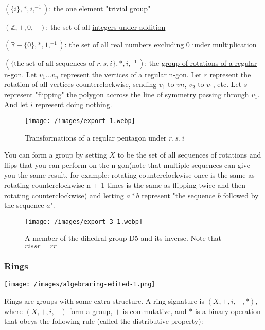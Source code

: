 \documentclass{article}
\begin{document}
\begin{itemize}
\item{$ (\{i\}, \ast, i, ^{-1})$: the one element "trivial group"}
\item{$ (\mathbb{Z}, +, 0, -)$: the set of all \href{https://en.wikipedia.org/wiki/Integer}{integers under addition}
\item{$ (\mathbb{R} - \{0\}, \ast, 1, ^{-1})$: the set of all real numbers excluding 0 under multiplication}
\item{$ (\{\text{the set of all sequences of  } r, s, i\}, \ast, i, ^{-1})$: the \href{https://en.wikipedia.org/wiki/Dihedral_group}{group of rotations of a regular n-gon}. Let $ v_1 \ldots v_n$ represent the vertices of a regular n-gon. Let $ r$ represent the rotation of all vertices counterclockwise, sending $ v_1$ to $ vn$, $ v_2$ to $ v_1$, etc. Let $ s$ represent "flipping" the polygon accross the line of symmetry passing through $ v_1$. And let $ i$ represent doing nothing.}

\begin{figure}
\texttt{[image: /images/export-1.webp]}
\caption{Transformations of a regular pentagon under $ r, s, i$}
\end{figure}

You can form a group by setting $ X$ to be the set of all sequences of rotations and flips that you can perform on the n-gon(note that multiple sequences can give you the same result, for example: rotating counterclockwise once is the same as rotating counterclockwise n + 1 times is the same as flipping twice and then rotating counterclockwise) and letting $ a \ast b$ represent "the sequence $ b$ followed by the sequence $ a$".

\begin{figure}
\texttt{[image: /images/export-3-1.webp]}
\caption{A member of the dihedral group D5 and its inverse. Note that $ rissr = rr$}
\end{figure}

\subsubsection{Rings}

\texttt{[image: /images/algebraring-edited-1.png]}

Rings are groups with some extra structure. A ring signature is $ (X, +, i, -, \ast)$, where $ (X, +, i, -)$ form a group, $ +$ is commutative, and $ \ast$ is a binary operation that obeys the following rule (called the distributive property):

}
\end{itemize}
\end{document}
